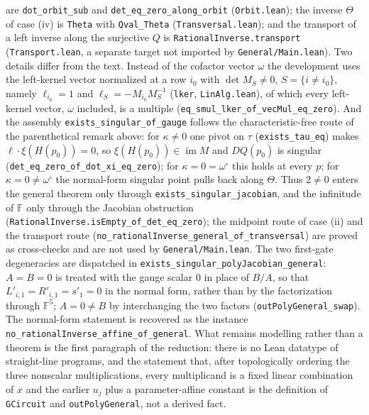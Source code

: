 are \texttt{dot\_orbit\_sub} and \texttt{det\_eq\_zero\_along\_orbit}
(\texttt{Orbit.lean}); the inverse $\Theta$ of case (iv) is \texttt{Theta} with
\texttt{Qval\_Theta} (\texttt{Transversal.lean}); and the transport of a left inverse
along the surjective $Q$ is \texttt{RationalInverse.transport} (\texttt{Transport.lean},
a separate target not imported by \texttt{General/\allowbreak Main.lean}).
Two details differ from the text.  Instead of the cofactor vector $\omega$ the
development uses the left-kernel vector normalized at a row $i_0$ with
$\det M_S\neq0$, $S=\{i\neq i_0\}$, namely $\ell_{i_0}=1$ and $\ell_S=-M_{i_0}M_S^{-1}$
(\texttt{lker}, \texttt{LinAlg.lean}), of which every left-kernel vector, $\omega$
included, is a multiple (\texttt{eq\_smul\_lker\_of\_vecMul\_eq\_zero}).  And the
assembly \texttt{exists\_singular\_of\_gauge} follows the characteristic-free route of
the parenthetical remark above: for $\kappa\neq0$ one pivot on $\tau$
(\texttt{exists\_tau\_eq}) makes $\ell\cdot\xi(H(p_0))=0$, so
$\xi(H(p_0))\in\operatorname{im}M$ and $DQ(p_0)$ is singular
(\texttt{det\_eq\_zero\_of\_dot\_xi\_eq\_zero}); for $\kappa=0=\omega^\circ$ this holds at
every $p$; for $\kappa=0\neq\omega^\circ$ the normal-form singular point pulls back
along $\Theta$.  Thus $2\neq0$ enters the general theorem only through
\texttt{exists\_singular\_jacobian}, and the infinitude of $\mathbb{F}$ only through the
Jacobian obstruction (\texttt{RationalInverse.isEmpty\_of\_det\_eq\_zero}); the midpoint
route of case (ii) and the transport route
(\texttt{no\_rationalInverse\_general\_of\_transversal}) are proved as cross-checks and
are not used by \texttt{General/\allowbreak Main.lean}.  The two first-gate degeneracies
are dispatched in \texttt{exists\_singular\_polyJacobian\_general}: $A=B=0$ is treated
with the gauge scalar $0$ in place of $B/A$, so that $L'_{i,1}=R'_{i,1}=s'_1=0$ in the
normal form, rather than by the factorization through $\mathbb{F}^5$; $A=0\neq B$ by
interchanging the two factors (\texttt{outPolyGeneral\_swap}).  The normal-form statement
is recovered as the instance \texttt{no\_rationalInverse\_affine\_of\_general}.  What
remains modelling rather than a theorem is the first paragraph of the reduction: there is
no Lean datatype of straight-line programs, and the statement that, after topologically
ordering the three nonscalar multiplications, every multiplicand is a fixed linear
combination of $x$ and the earlier $u_j$ plus a parameter-affine constant is the
definition of \texttt{GCircuit} and \texttt{outPolyGeneral}, not a derived fact.
